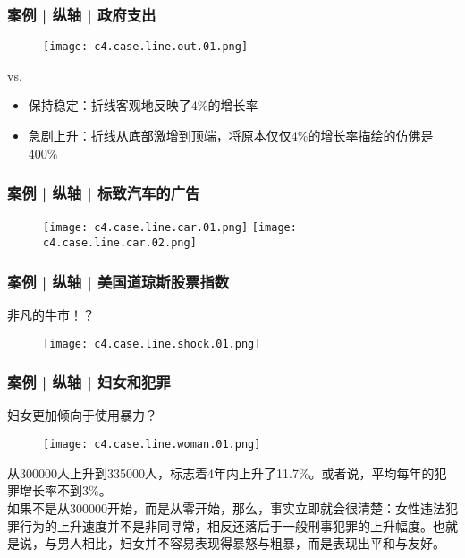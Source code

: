 \begin{frame}
  \frametitle{案例 | 纵轴 | 政府支出}
  \begin{figure}
    \centering
    \texttt{[image: c4.case.line.out.01.png]}
  \end{figure}
  \vspace{-1em}
  \begin{block}{vs.}
    \begin{itemize}
      \item 保持稳定：折线客观地反映了4\%的增长率
      \item 急剧上升：折线从底部激增到顶端，将原本仅仅4\%的增长率描绘的仿佛是400\%
    \end{itemize}
  \end{block}
\end{frame}

\begin{frame}
  \frametitle{案例 | 纵轴 | 标致汽车的广告}
  \begin{figure}
    \centering
    \texttt{[image: c4.case.line.car.01.png]}\quad
    \texttt{[image: c4.case.line.car.02.png]}
  \end{figure}
\end{frame}

\begin{frame}
  \frametitle{案例 | 纵轴 | 美国道琼斯股票指数}
  \begin{block}{非凡的牛市！？}
    \begin{figure}
      \centering
      \texttt{[image: c4.case.line.shock.01.png]}
    \end{figure}
  \end{block}
\end{frame}

\begin{frame}
  \frametitle{案例 | 纵轴 | 妇女和犯罪}
  \begin{block}{妇女更加倾向于使用暴力？}
    \begin{figure}
      \centering
      \texttt{[image: c4.case.line.woman.01.png]}
    \end{figure}
    \vspace{-1em}
    \pause
    从300000人上升到335000人，标志着4年内上升了11.7\%。或者说，平均每年的犯罪增长率不到3\%。\\
    \vspace{0.2em}
如果不是从300000开始，而是从零开始，那么，事实立即就会很清楚：女性违法犯罪行为的上升速度并不是非同寻常，相反还落后于一般刑事犯罪的上升幅度。也就是说，与男人相比，妇女并不容易表现得暴怒与粗暴，而是表现出平和与友好。
  \end{block}
\end{frame}

